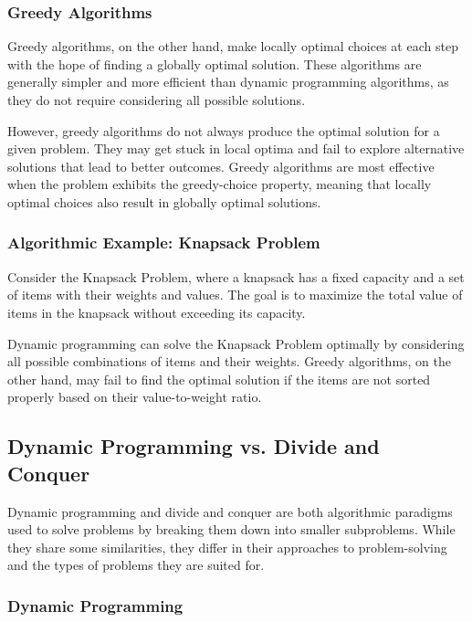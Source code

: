 \documentclass[12pt]{book} %
\begin{document}
\subsubsection{Greedy Algorithms}

Greedy algorithms, on the other hand, make locally optimal choices at each step with the hope of finding a globally optimal solution. These algorithms are generally simpler and more efficient than dynamic programming algorithms, as they do not require considering all possible solutions.

However, greedy algorithms do not always produce the optimal solution for a given problem. They may get stuck in local optima and fail to explore alternative solutions that lead to better outcomes. Greedy algorithms are most effective when the problem exhibits the greedy-choice property, meaning that locally optimal choices also result in globally optimal solutions.

\subsubsection{Algorithmic Example: Knapsack Problem}

Consider the Knapsack Problem, where a knapsack has a fixed capacity and a set of items with their weights and values. The goal is to maximize the total value of items in the knapsack without exceeding its capacity.

Dynamic programming can solve the Knapsack Problem optimally by considering all possible combinations of items and their weights. Greedy algorithms, on the other hand, may fail to find the optimal solution if the items are not sorted properly based on their value-to-weight ratio.

\subsection{Dynamic Programming vs. Divide and Conquer}

Dynamic programming and divide and conquer are both algorithmic paradigms used to solve problems by breaking them down into smaller subproblems. While they share some similarities, they differ in their approaches to problem-solving and the types of problems they are suited for.

\subsubsection{Dynamic Programming}
\end{document}

